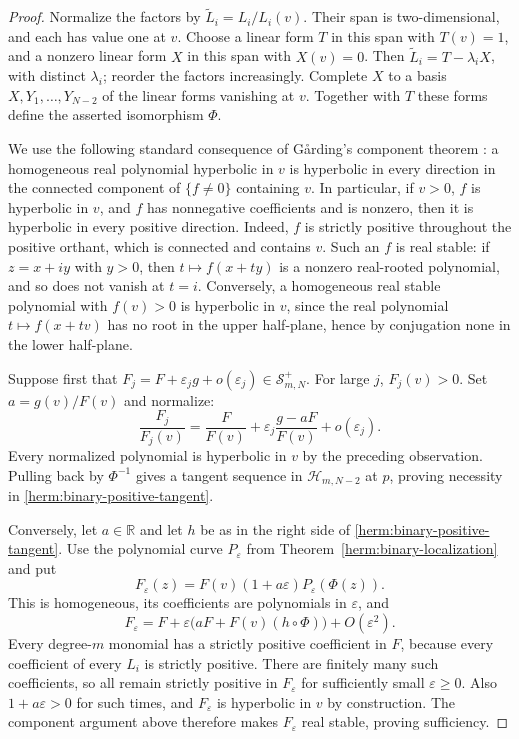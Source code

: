 \documentclass[reqno]{amsart}
\theoremstyle{definition}
\theoremstyle{remark}
\newcommand{\R}{\mathbb R}
\begin{document}
\begin{proof}
Normalize the factors by $\widetilde L_i=L_i/L_i(v)$.
Their span is two-dimensional, and each has value one at $v$.
Choose a linear form $T$ in this span with $T(v)=1$, and a nonzero
linear form $X$ in this span with $X(v)=0$.
Then $\widetilde L_i=T-\lambda_iX$, with distinct $\lambda_i$;
reorder the factors increasingly.  Complete $X$ to a basis
$X,Y_1,\ldots,Y_{N-2}$ of the linear forms vanishing at $v$.
Together with $T$ these forms define the asserted isomorphism $\Phi$.

We use the following standard consequence of G\aa rding's component
theorem
\cite[Corollary~2.7 and Theorem~2.9]{HarveyLawson09}: a homogeneous real polynomial hyperbolic in
$v$ is hyperbolic in every direction in the connected component of
$\{f\ne0\}$ containing $v$.
In particular, if $v>0$, $f$ is hyperbolic in $v$, and $f$ has
nonnegative coefficients and is nonzero, then it is hyperbolic in
every positive direction.  Indeed, $f$ is strictly positive throughout
the positive orthant, which is connected and contains $v$.
Such an $f$ is real stable: if $z=x+iy$ with $y>0$, then
$t\mapsto f(x+ty)$ is a nonzero real-rooted polynomial, and so does
not vanish at $t=i$.  Conversely, a homogeneous real stable polynomial
with $f(v)>0$ is hyperbolic in $v$, since the real polynomial
$t\mapsto f(x+tv)$ has no root in the upper half-plane, hence by
conjugation none in the lower half-plane.

Suppose first that
$F_j=F+\varepsilon_jg+o(\varepsilon_j)\in\mathcal S^+_{m,N}$.
For large $j$, $F_j(v)>0$.  Set $a=g(v)/F(v)$ and normalize:
\[
 \frac{F_j}{F_j(v)}
 =\frac{F}{F(v)}
  +\varepsilon_j\frac{g-aF}{F(v)}+o(\varepsilon_j).
\]
Every normalized polynomial is hyperbolic in $v$ by the preceding
observation.  Pulling back by $\Phi^{-1}$ gives a tangent sequence
in $\mathcal H_{m,N-2}$ at $p$, proving necessity in
\eqref{herm:binary-positive-tangent}.

Conversely, let $a\in\R$ and let $h$ be as in the right side of
\eqref{herm:binary-positive-tangent}.  Use the polynomial curve
$P_\varepsilon$ from Theorem~\ref{herm:binary-localization} and put
\[
 F_\varepsilon(z)=F(v)(1+a\varepsilon)
                         P_\varepsilon(\Phi(z)).
\]
This is homogeneous, its coefficients are polynomials in
$\varepsilon$, and
\[
 F_\varepsilon=F+\varepsilon\bigl(aF+F(v)(h\circ\Phi)\bigr)
                      +O(\varepsilon^2).
\]
Every degree-$m$ monomial has a strictly positive coefficient in
$F$, because every coefficient of every $L_i$ is strictly positive.
There are finitely many such coefficients, so all remain strictly
positive in $F_\varepsilon$ for sufficiently small
$\varepsilon\geq0$.  Also $1+a\varepsilon>0$ for such times, and
$F_\varepsilon$ is hyperbolic in $v$ by construction.
The component argument above therefore makes $F_\varepsilon$ real
stable, proving sufficiency.
\end{proof}
\end{document}
